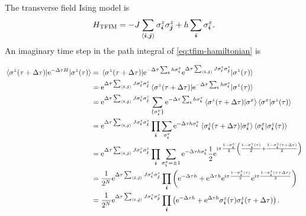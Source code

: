 \documentclass[hyperref, a4paper]{article}
\newcommand*{\ii}{\mathrm{i}}
\newcommand*{\ee}{\mathrm{e}}
\newcommand*{\pair}[1]{\langle #1 \rangle}
\newcommand*{\tfim}{transverse field Ising model }
\begin{document}
The \tfim is 
\begin{equation}
    H_\text{TFIM} = - J \sum_{\pair{\vb*{i}, \vb*{j}}} \sigma^z_{\vb*{i}} \sigma^z_{\vb*{j}} + h \sum_{\vb*{i}} \sigma^x_{\vb*{i}}.
    \label{eq:tfim-hamiltonian}
\end{equation}
An imaginary time step in the path integral of \eqref{eq:tfim-hamiltonian} is 

\[
    \begin{aligned}
        \mel{\sigma^z(\tau + \Delta \tau)}{\ee^{-\Delta \tau {H}}}{\sigma^z(\tau)} &= \mel{\sigma^z(\tau + \Delta \tau)}{\ee^{- \Delta \tau \sum_{\vb*{i}} h {\sigma}^x_{\vb*{i}}} \ee^{\Delta \tau \sum_{\pair{\vb*{i}, \vb*{j}}} J {\sigma}_{\vb*{i}}^z {\sigma}_{\vb*{j}}^z}}{\sigma^z(\tau)} \\
        &= \ee^{\Delta \tau \sum_{\pair{\vb*{i}, \vb*{j}}} J \sigma_{\vb*{i}}^z \sigma_{\vb*{j}}^z} \mel{\sigma^z(\tau + \Delta \tau)}{\ee^{- \Delta \tau \sum_{\vb*{i}} h {\sigma}^x_{\vb*{i}}}}{\sigma^z(\tau)} \\
        &= \ee^{\Delta \tau \sum_{\pair{\vb*{i}, \vb*{j}}} J \sigma_{\vb*{i}}^z \sigma_{\vb*{j}}^z} \sum_{\{\sigma^x_{\vb*{i}}\}} \ee^{- \Delta \tau \sum_{\vb*{i}} h \sigma^x_{\vb*{i}}} \braket{\sigma^z(\tau + \Delta \tau)}{\sigma^x} \braket{\sigma^x}{\sigma^z(\tau)} \\
        &= \ee^{\Delta \tau \sum_{\pair{\vb*{i}, \vb*{j}}} J \sigma_{\vb*{i}}^z \sigma_{\vb*{j}}^z} \prod_{\vb*{i}} \sum_{\sigma^x_{\vb*{i}}} \ee^{- \Delta \tau h \sigma^x_{\vb*{i}}} \braket{\sigma^z_{\vb*{i}}(\tau + \Delta \tau)}{\sigma^x_{\vb*{i}}} \braket{\sigma^x_{\vb*{i}}}{\sigma^z_{\vb*{i}}(\tau)} \\
        &= \ee^{\Delta \tau \sum_{\pair{\vb*{i}, \vb*{j}}} J \sigma_{\vb*{i}}^z \sigma_{\vb*{j}}^z} \prod_{\vb*{i}} \sum_{\sigma^x_{\vb*{i}} = \pm 1} \ee^{- \Delta \tau h \sigma^x_{\vb*{i}}} \frac{1}{2} \ee^{\ii \pi \frac{1 - \sigma^x_{\vb*{i}}}{2} \left( \frac{1 - \sigma^z_{\vb*{i}}(\tau)}{2} + \frac{1 - \sigma^z_{\vb*{i}}(\tau + \Delta \tau)}{2} \right)} \\
        &= \frac{1}{2^N} \ee^{\Delta \tau \sum_{\pair{\vb*{i}, \vb*{j}}} J \sigma_{\vb*{i}}^z \sigma_{\vb*{j}}^z} \prod_{\vb*{i}} \left( \ee^{- \Delta \tau h} + \ee^{\Delta \tau h} \ee^{\ii \pi \frac{1 - \sigma^z_{\vb*{i}}(\tau)}{2}} \ee^{\ii \pi \frac{1 - \sigma^z_{\vb*{i}}(\tau + \Delta \tau)}{2}} \right) \\
        &= \frac{1}{2^N} \ee^{\Delta \tau \sum_{\pair{\vb*{i}, \vb*{j}}} J \sigma_{\vb*{i}}^z \sigma_{\vb*{j}}^z} \prod_{\vb*{i}} \left( \ee^{- \Delta \tau h} + \ee^{\Delta \tau h} \sigma^z_{\vb*{i}}(\tau) \sigma^z_{\vb*{i}}(\tau + \Delta \tau) \right).
    \end{aligned}
\]
\end{document}
